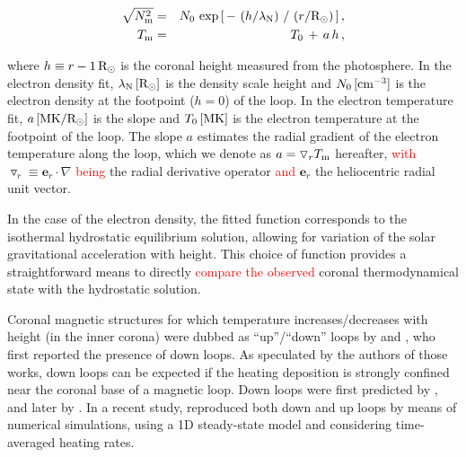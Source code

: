 \documentclass[namedreferences]{solarphysics}
\def\edit#1{\textcolor{Red}{#1}}
\renewcommand{\l}{\lambda_{\rm N}}%
\newcommand{\mrsun}{{\rm R_\odot}}
\newcommand{\MK}{{\rm MK}}
\newcommand{\cm}{{\rm cm}}
\newcommand{\cminvc}{\cm^{-3}}
\newcommand{\dr}{\triangledown_r}
\newcommand{\er}{\mathbf{e}_r}
\newcommand{\Tm}{T_{\rm m}}
\newcommand{\Nsqm}{N^2_{{\rm m}}}
\newcommand{\sqravgN}{\sqrt{\Nsqm}}
\begin{document}
\begin{article}
\begin{eqnarray}\label{Nfit}
\sqravgN &=& N_0\,\exp{\left[\,-\,\left(h/\l\right)\,/\,\left(r/\mrsun\right)\,\right]} \,,\\
\label{Tfit}
\Tm &=& T_0\,+\,a\,h\,,
\end{eqnarray}

\noindent
where $h \equiv r - 1\,\mrsun$ is the coronal height measured from the photosphere. In the electron density fit, $\l\,[\mrsun]$ is the density scale height and $N_0\,[\cminvc]$ is the electron density at the footpoint ($h=0$) of the loop. In the electron temperature fit, $a\,[\MK/\mrsun]$ is the slope and $T_0\,[\MK]$ is the electron temperature at the footpoint of the loop. The slope $a$ estimates the radial gradient of the electron temperature along the loop, which we denote as $a = \dr\Tm$ hereafter, \edit{with} $\dr\equiv\er\cdot\nabla$ \edit{being} the radial derivative operator \edit{and} $\er$ the heliocentric radial unit vector.

In the case of the electron density, the fitted function corresponds to the isothermal hydrostatic equilibrium solution, allowing for variation of the solar gravitational acceleration with height. This choice of function provides a straightforward means to directly \edit{compare the observed} coronal thermodynamical state with the hydrostatic solution.

{Coronal magnetic structures for which temperature increases/decreases with height (in the inner corona) were dubbed as “up”/“down” loops by \citet{huang_2012} and \citet{nuevo_2013}, who first reported the presence of down loops. As speculated by the authors of those works, down loops can be expected if the heating deposition is strongly confined near the coronal base of a magnetic loop. Down loops were first predicted by \citet{serio_1981}, and later by \citet{aschwanden_2002}. In a recent study, \citet{schiff_2016} reproduced both down and up loops by means of numerical simulations, using a 1D steady-state model and {considering time-averaged heating rates.}}


\end{article}
\end{document}
